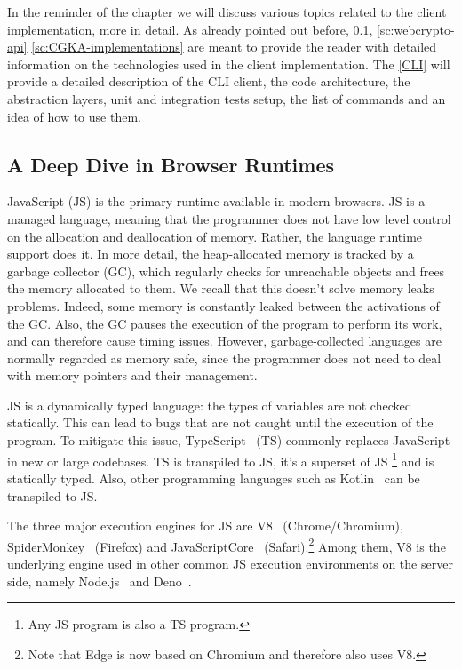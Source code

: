 In the reminder of the chapter we will discuss various topics
related to the client implementation, more in detail.
As already pointed out before, \cref{sc:browser-runtimes}, \cref{sc:webcrypto-api} \cref{sc:CGKA-implementations}
are meant to provide the reader with detailed information 
on the technologies used in the client implementation.
The \cref{CLI} will provide a detailed description of the CLI client,
the code architecture, the abstraction layers, unit and
integration tests setup, the list of commands and an idea of how
to use them.

\subsection{A Deep Dive in Browser Runtimes}\label{sc:browser-runtimes}

JavaScript (JS) is the primary runtime available in modern browsers.
JS is a managed language, meaning that the programmer
does not have low level control on the allocation and
deallocation of memory. Rather, the language runtime support does it.
In more detail, the heap-allocated memory
is tracked by a garbage collector (GC), which regularly
checks for unreachable objects and frees the memory allocated
to them. We recall that this doesn't solve memory leaks
problems. Indeed, some memory is constantly leaked
between the activations of the GC. Also, the GC
pauses the execution of the program to perform its work,
and can therefore cause timing issues. However, garbage-collected
languages are normally regarded as memory safe, since
the programmer does not need to deal with memory pointers
and their management.


JS is a dynamically
typed language: the types of variables are not checked
statically. This can lead to bugs that are not caught
until the execution of the program.
To mitigate this issue, TypeScript~\cite{bierman2014understanding} (TS)
commonly replaces JavaScript in new or large codebases.
TS is transpiled to JS, it's a superset of JS
\footnote{Any JS program is also a TS program.}
and is statically typed.
Also, other programming languages such as
Kotlin~\cite{KotlinToJs} can be transpiled to JS.

The three major execution engines for JS are V8~\cite{V8} (Chrome/Chromium),
SpiderMonkey~\cite{SpiderMonkey} (Firefox) and JavaScriptCore~\cite{JavaScriptCore} (Safari).\footnote{Note that Edge is now based on Chromium and therefore
also uses V8.}
Among them, V8 is the underlying engine used in other
common JS execution environments on the server side, 
namely Node.js~\cite{NodeJS} and Deno~\cite{Deno}.


